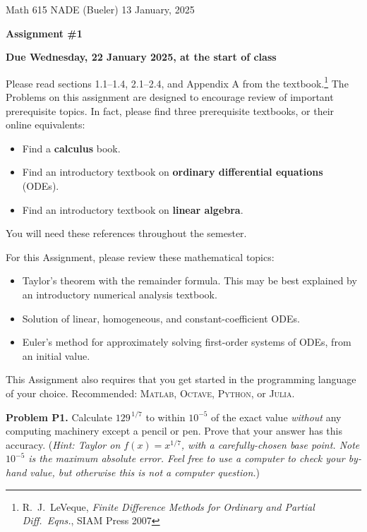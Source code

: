 \documentclass[12pt]{amsart}
\newcommand{\Julia}{\textsc{Julia}\xspace}
\newcommand{\Matlab}{\textsc{Matlab}\xspace}
\newcommand{\Octave}{\textsc{Octave}\xspace}
\newcommand{\Python}{\textsc{Python}\xspace}
\newcommand{\prob}[1]{\bigskip\noindent\textbf{#1}\quad }
\begin{document}
\scriptsize \noindent Math 615 NADE (Bueler) \hfill 13 January, 2025
\normalsize

\medskip\bigskip

\Large\centerline{\textbf{Assignment \#1}}
\large
\bigskip

\centerline{\textbf{Due Wednesday, 22 January 2025, at the start of class}}
\bigskip
\normalsize

\thispagestyle{empty}

\bigskip
Please read sections 1.1--1.4, 2.1--2.4, and Appendix A from the textbook.\footnote{R.~J.~LeVeque, \emph{Finite Difference Methods for Ordinary and Partial Diff.~Eqns.}, SIAM Press 2007}  The Problems on this assignment are designed to encourage review of important prerequisite topics.  In fact, please find three prerequisite textbooks, or their online equivalents:
\begin{itemize}
\item Find a \textbf{calculus} book.
\item Find an introductory textbook on \textbf{ordinary differential equations} (ODEs).
\item Find an introductory textbook on \textbf{linear algebra}.
\end{itemize}
You will need these references throughout the semester.

For this Assignment, please review these mathematical topics:
\begin{itemize}
  \item Taylor's theorem with the remainder formula.  This may be best explained by an introductory numerical analysis textbook.
  \item Solution of linear, homogeneous, and constant-coefficient ODEs.
  \item Euler's method for approximately solving first-order systems of ODEs, from an initial value.
\end{itemize}
This Assignment also requires that you get started in the programming language of your choice.  Recommended: \Matlab, \Octave, \Python, or \Julia.

\medskip
\prob{Problem P1.}  Calculate $129^{\,1/7}$ to within $10^{-5}$ of the exact value \emph{without} any computing machinery except a pencil or pen.  Prove that your answer has this accuracy.  (\emph{Hint: Taylor on $f(x)=x^{1/7}$, with a carefully-chosen base point.  Note $10^{-5}$ is the maximum absolute error.  Feel free to use a computer to \emph{check} your by-hand value, but otherwise this is not a computer question.})
\end{document}
